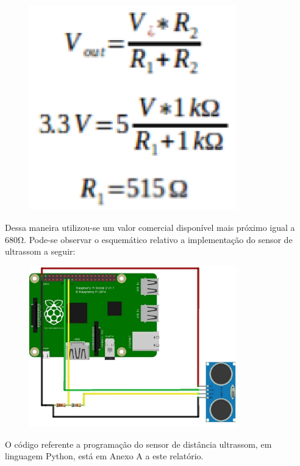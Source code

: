 \begin{figure}[H]
    \centering
    \includegraphics[width=0.8\textwidth]{figuras/vout.eps}
    \caption{}
    \label{fig:catia01}
\end{figure}

Dessa maneira utilizou-se um valor comercial disponível mais próximo igual a 680Ω. Pode-se observar o esquemático relativo a implementação do sensor de ultrassom a seguir:

\begin{figure}[H]
    \centering
    \includegraphics[width=0.8\textwidth]{figuras/esquematico_ultrassom.eps}
    \caption{}
    \label{fig:catia01}
\end{figure}

O código referente a programação do sensor de distância ultrassom, em linguagem Python, está em Anexo A a este relatório.

